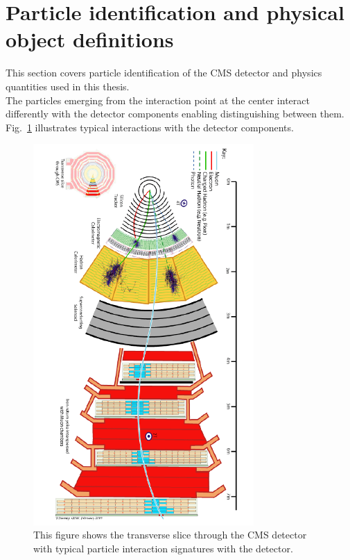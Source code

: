 \section{Particle identification and physical object definitions}
\label{sec:physics_objects}
This section covers particle identification of the CMS detector and physics quantities used in this thesis.\\
The particles emerging from the interaction point at the center interact differently with the detector components enabling distinguishing between them. Fig.~\ref{fig:particlePassing} illustrates typical interactions with the detector components.
\begin{figure}[tbhn]
\begin{center}
\includegraphics[width=0.75\textwidth]{detector/figures/particlePassing.png}
\end{center}
\caption{This figure shows the transverse slice through the CMS detector with typical particle interaction signatures with the detector.}
\label{fig:particlePassing}
\end{figure}

